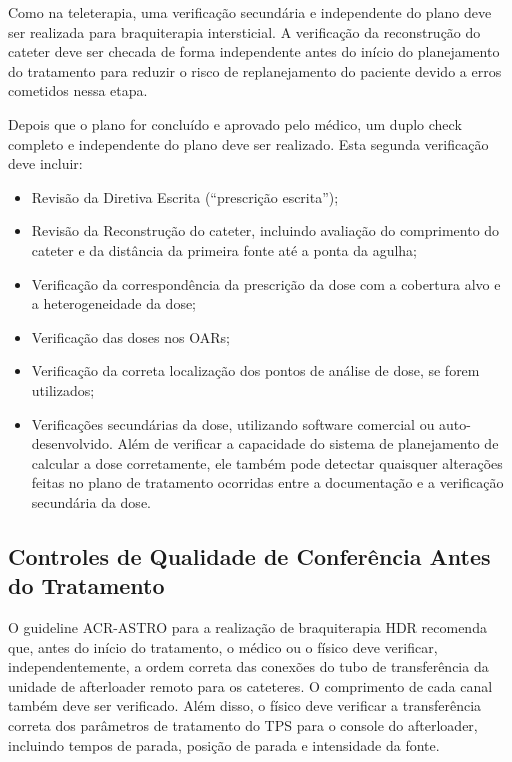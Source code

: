 \documentclass[11pt,a4paper]{article}
\begin{document}
	Como na teleterapia, uma verificação secundária e independente do plano deve ser realizada para braquiterapia intersticial. A verificação da reconstrução do cateter deve ser checada de forma independente antes do início do planejamento do tratamento para reduzir o risco de  replanejamento do paciente devido a erros cometidos nessa etapa.

	Depois que o plano for concluído e aprovado pelo médico, um duplo check completo e independente do plano deve ser realizado. Esta segunda verificação deve incluir:

	\begin{itemize}[label=\textcolor{CarnationPink}{$\blacksquare$}]
		\item Revisão da Diretiva Escrita (``prescrição escrita'');
		\item Revisão da Reconstrução do cateter, incluindo avaliação do comprimento do cateter e da distância da primeira fonte até a ponta da agulha;
		\item Verificação da correspondência da prescrição da dose com a cobertura alvo e a heterogeneidade da dose;
		\item Verificação das doses nos OARs;
		\item Verificação da correta localização dos pontos de análise de dose, se forem utilizados;
		\item Verificações secundárias da dose, utilizando software comercial ou auto-desenvolvido. Além de verificar a capacidade do sistema de planejamento de calcular a dose corretamente, ele também pode detectar quaisquer alterações feitas no plano de tratamento ocorridas entre a documentação e a verificação secundária da dose.
	\end{itemize}


\subsection*{Controles de Qualidade de Conferência Antes do Tratamento}

	O guideline ACR-ASTRO para a realização de braquiterapia HDR recomenda que, antes do início do tratamento, o médico ou o físico deve verificar, independentemente, a ordem correta das conexões do tubo de transferência da unidade de afterloader remoto para os cateteres. O comprimento de cada canal também deve ser verificado. Além disso, o físico deve verificar a transferência correta dos parâmetros de tratamento do TPS para o console do afterloader, incluindo tempos de parada, posição de parada e intensidade da fonte.
\end{document}
